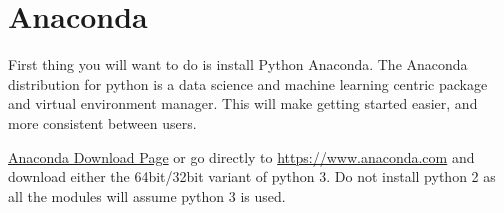 \section{Anaconda}
\label{sec:anaconda}
First thing you will want to do is install Python Anaconda.
The Anaconda distribution for python is a data science and machine learning centric package and virtual environment manager.
This will make getting started easier, and more consistent between users.




\href{https://www.anaconda.com/download/#windows}{Anaconda Download Page} or go directly to \url{https://www.anaconda.com} and download either the 64bit/32bit variant of python 3. Do not install python 2 as all the modules will assume python 3 is used.
